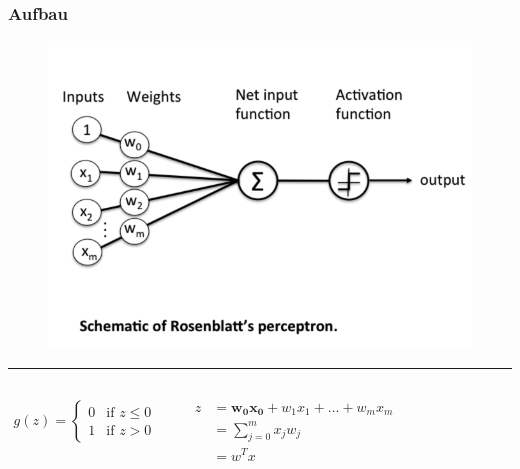 \begin{frame}
\frametitle{Aufbau}

\begin{figure}
\includegraphics[width=.6\linewidth]{./geschichtliches/perceptron/img/perceptron_schematisch_alpha}
\end{figure}


\hrule


\begin{columns}

\begin{align*}
g(z) =\begin{cases}
	0 & \mbox{if } z \leq 0 \\
    1 & \mbox{if } z > 0
  \end{cases}
\end{align*}
\vspace{1mm}

\begin{align*}
\begin{split}
z & = \mathbf{w_0x_{0}} + w_1x_{1} + \dots + w_mx_{m} \\
 & = \sum_{j=0}^{m} x_{j}w_{j} \\
 & = w^Tx
\end{split}
\end{align*}

\end{columns}

\end{frame}


